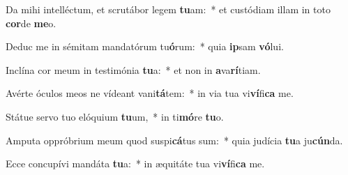 \item Da mihi intelléctum, et scrutábor legem \textbf{tu}am:~* et custódiam illam in toto \textbf{cor}de \textbf{me}o.
\item Deduc me in sémitam mandatórum tu\textbf{ó}rum:~* quia \textbf{ip}sam \textbf{vó}lui.
\item Inclína cor meum in testimónia \textbf{tu}a:~* et non in \textbf{a}va\textbf{rí}tiam.
\item Avérte óculos meos ne vídeant vani\textbf{tá}tem:~* in via tua vi\textbf{ví}fi\textbf{ca} me.
\item Státue servo tuo elóquium \textbf{tu}um,~* in ti\textbf{mó}re \textbf{tu}o.
\item Amputa oppróbrium meum quod suspi\textbf{cá}tus sum:~* quia judícia \textbf{tu}a ju\textbf{cún}da.
\item Ecce concupívi mandáta \textbf{tu}a:~* in æquitáte tua vi\textbf{ví}fi\textbf{ca} me.
